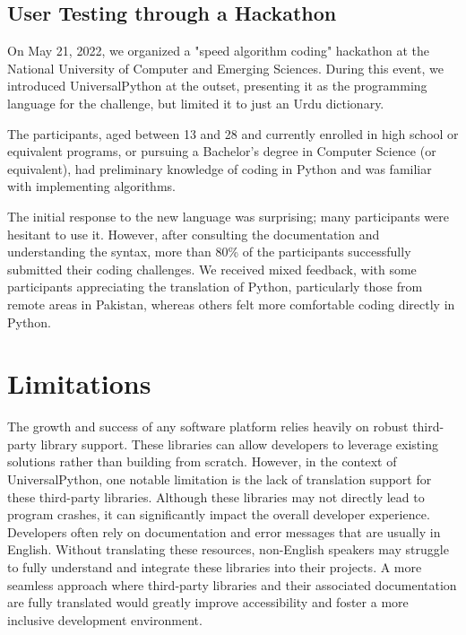 \documentclass[conference]{IEEEtran}
\begin{document}
\subsection{User Testing through a Hackathon}

On May 21, 2022, we organized a "speed algorithm coding" hackathon at the National University of Computer and Emerging Sciences. During this event, we introduced UniversalPython at the outset, presenting it as the programming language for the challenge, but limited it to just an Urdu dictionary.

The participants, aged between 13 and 28 and currently enrolled in high school or equivalent programs, or pursuing a Bachelor's degree in Computer Science (or equivalent), had preliminary knowledge of coding in Python and was familiar with implementing algorithms.

The initial response to the new language was surprising; many participants were hesitant to use it. However, after consulting the documentation and understanding the syntax, more than 80\% of the participants successfully submitted their coding challenges. We received mixed feedback, with some participants appreciating the translation of Python, particularly those from remote areas in Pakistan, whereas others felt more comfortable coding directly in Python.

\section{Limitations}

The growth and success of any software platform relies heavily on robust third-party library support. These libraries can allow developers to leverage existing solutions rather than building from scratch. However, in the context of UniversalPython, one notable limitation is the lack of translation support for these third-party libraries. Although these libraries may not directly lead to program crashes, it can significantly impact the overall developer experience. Developers often rely on documentation and error messages that are usually in English. Without translating these resources, non-English speakers may struggle to fully understand and integrate these libraries into their projects. A more seamless approach where third-party libraries and their associated documentation are fully translated would greatly improve accessibility and foster a more inclusive development environment.
\end{document}
